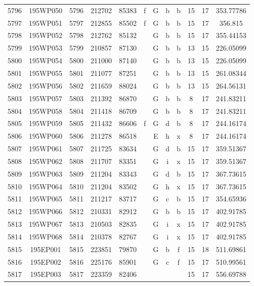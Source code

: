 \begin{tabular}{|*{12}{c|}}
5796 & 195WP050 & 5796 & 212702 & 85383 & f & G & b & b & 15 & 17 & 353.77786 \\ 
5797 & 195WP051 & 5797 & 212855 & 85502 & f & G & b & b & 15 & 17 & 356.815 \\ 
5798 & 195WP052 & 5798 & 212762 & 85132 &  & G & b & b & 15 & 17 & 355.44153 \\ 
5799 & 195WP053 & 5799 & 210857 & 87130 &  & G & b & b & 13 & 15 & 226.05099 \\ 
5800 & 195WP054 & 5800 & 211000 & 87140 &  & G & b & b & 13 & 15 & 226.05099 \\ 
5801 & 195WP055 & 5801 & 211077 & 87251 &  & G & b & b & 13 & 15 & 261.08344 \\ 
5802 & 195WP056 & 5802 & 211659 & 88024 &  & G & b & b & 13 & 15 & 264.56131 \\ 
5803 & 195WP057 & 5803 & 211392 & 86870 &  & G & b & b & 8 & 17 & 241.83211 \\ 
5804 & 195WP058 & 5804 & 211418 & 86709 &  & G & b & b & 8 & 17 & 241.83211 \\ 
5805 & 195WP059 & 5805 & 211432 & 86606 & f & G & d & b & 8 & 17 & 244.16174 \\ 
5806 & 195WP060 & 5806 & 211278 & 86518 &  & E & h & x & 8 & 17 & 244.16174 \\ 
5807 & 195WP061 & 5807 & 211725 & 83634 &  & G & d & b & 15 & 17 & 359.51367 \\ 
5808 & 195WP062 & 5808 & 211707 & 83351 &  & G & i & x & 15 & 17 & 359.51367 \\ 
5809 & 195WP063 & 5809 & 211204 & 83343 &  & G & d & b & 15 & 17 & 367.73615 \\ 
5810 & 195WP064 & 5810 & 211204 & 83502 &  & G & h & x & 15 & 17 & 367.73615 \\ 
5811 & 195WP065 & 5811 & 211217 & 83717 &  & G & c & b & 15 & 17 & 354.65936 \\ 
5812 & 195WP066 & 5812 & 210331 & 82912 &  & G & b & b & 15 & 17 & 402.91785 \\ 
5813 & 195WP067 & 5813 & 210503 & 82835 &  & G & i & x & 15 & 17 & 402.91785 \\ 
5814 & 195WP068 & 5814 & 210378 & 82767 &  & G & i & x & 15 & 17 & 402.91785 \\ 
5815 & 195EP001 & 5815 & 223851 & 79870 &  & G & b & f & 15 & 18 & 511.69861 \\ 
5816 & 195EP002 & 5816 & 225176 & 85901 &  & G & c & f & 15 & 17 & 510.99561 \\ 
5817 & 195EP003 & 5817 & 223359 & 82406 &  &  &  &  & 15 & 17 & 556.69788 \\ 

\end{tabular}
